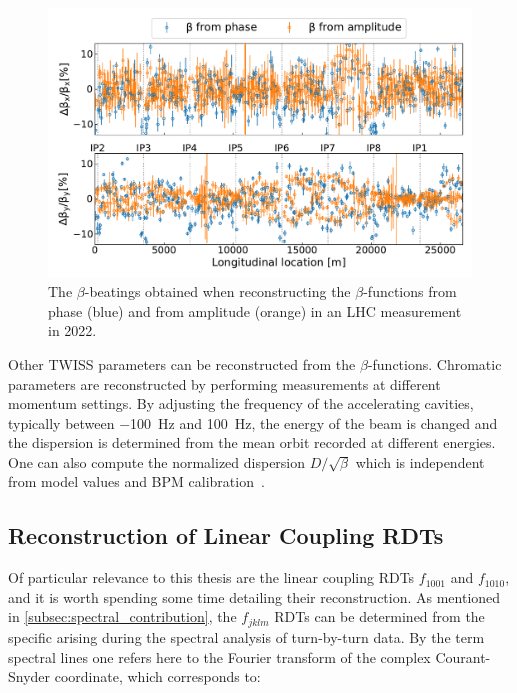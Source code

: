\begin{figure}[!htb]
  \centering
  \includegraphics*[width=0.99\linewidth]{Figures/Optics_Measurements_Corrections_at_LHC/betabeat_phase_vs_amp.pdf}
  \caption{The \(\beta\)-beatings obtained when reconstructing the \(\beta\)-functions from phase (\textcolor{mplblue}{blue}) and from amplitude (\textcolor{mplorange}{orange}) in an LHC measurement in \num{2022}.}
  \label{figure:betabeating_phase_vs_amp}
\end{figure}

Other TWISS parameters can be reconstructed from the \(\beta\)-functions.
Chromatic parameters are reconstructed by performing measurements at different momentum settings.
By adjusting the frequency of the accelerating cavities, typically between \qty{-100}{\hertz} and \qty{+100}{\hertz}, the energy of the beam is changed and the dispersion is determined from the mean orbit recorded at different energies.
One can also compute the normalized dispersion \(D / \sqrt{\beta}\) which is independent from model values and BPM calibration~\cite{PAC:Calaga:BPM_Calibration_Independent_LHC_Optics_Correction}.

\subsection{Reconstruction of Linear Coupling RDTs}

Of particular relevance to this thesis are the linear coupling RDTs \(f_{1001}\) and \(f_{1010}\), and it is worth spending some time detailing their reconstruction.
As mentioned in \cref{subsec:spectral_contribution}, the \(f_{jklm}\) RDTs can be determined from the specific  arising during the spectral analysis of turn-by-turn data.
By the term spectral lines one refers here to the Fourier transform of the complex Courant-Snyder coordinate, which corresponds to:

